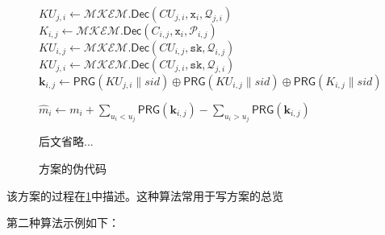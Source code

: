 \begin{figure}
\begin{mdframed}
\begin{multicols}{2}
\begin{algorithmic}[1]
                 \textcolor{blue}{}
                     
                            \State $KU_{j,i} \leftarrow \mathcal{MKEM}.\mathsf{Dec}(CU_{j,i}, \mathtt{x}_{i}, \mathcal{Q}_{j,i})$
                            \State $K_{i,j} \leftarrow \mathcal{MKEM}.\mathsf{Dec}(C_{i,j}, \mathtt{x}_{i}, \mathcal{P}_{i,j})$
                        \EndFor
                    \EndFor
                     
                            \State $KU_{i,j} \leftarrow \mathcal{MKEM}.\mathsf{Dec}(CU_{i,j}, \mathtt{sk}, \mathcal{Q}_{i,j})$
                            \State $KU_{j,i} \leftarrow \mathcal{MKEM}.\mathsf{Dec}(CU_{j,i}, \mathtt{sk}, \mathcal{Q}_{j,i})$
                        \EndFor
                    \EndFor
                    \State $\mathbf{k}_{i,j} \leftarrow \mathsf{PRG}(KU_{j,i} \| sid) \oplus \mathsf{PRG}(KU_{i,j} \| sid) \oplus \mathsf{PRG}(K_{i,j} \| sid)$ 
                \EndWhile
                \Statex
                
                 \textcolor{blue}{}
                     
                            \State $\hat{m}_i \leftarrow m_i + \sum_{u_i < u_j} \mathsf{PRG}(\mathbf{k}_{i,j}) - \sum_{u_i > u_j} \mathsf{PRG}(\mathbf{k}_{i,j})$
                        \EndFor
                    \EndFor
                \EndWhile
                \Statex

                \State 后文省略...

            \EndWhile
        \end{algorithmic}
    \end{multicols}
    \end{mdframed}
    \caption[方案一伪代码]{方案的伪代码}
    \label{fig_algo}
\end{figure}

该方案的过程在\cref{fig_algo}中描述。这种算法常用于写方案的总览

第二种算法示例如下：

